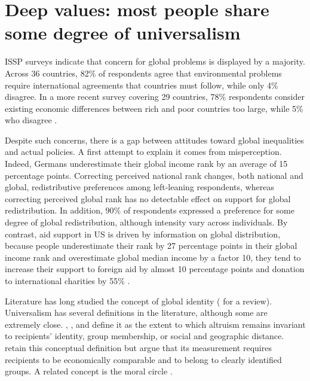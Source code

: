 \section{Deep values: most people share some degree of universalism}





ISSP surveys indicate that concern for global problems is displayed by a majority. Across 36 countries, 82\% of respondents agree that environmental problems require international agreements that countries must follow, while only 4\% disagree. In a more recent survey covering 29 countries, 78\% respondents consider existing economic differences between rich and poor countries too large, while 5\% who disagree \citep{issp_environment_2010,issp_inequality_2019}. 

Despite such concerns, there is a gap between attitudes toward global inequalities and actual policies. A first attempt to explain it comes from misperception. Indeed, Germans underestimate their global income rank by an average of 15 percentage points. Correcting perceived national rank changes, both national and global, redistributive preferences among left-leaning respondents, whereas correcting perceived global rank has no detectable effect on support for global redistribution. In addition, 90\% of respondents expressed a preference for some degree of global redistribution, although intensity vary across individuals.
By contrast, aid support in US is driven by information on global distribution, because people underestimate their rank by 27 percentage points in their global income rank and overestimate global median income by a factor 10, they tend to increase their support to foreign aid by almost 10 percentage points and donation to international charities by 55\% \citep{nair_misperceptions_2018}.


Literature has long studied the concept of global identity (\citet{rey_2018} for a review). Universalism has several definitions in the literature, although some are extremely close. \citet{enke_moral_2023}, \citet{enke_universalism_2024}, and \citet{cappelen_universalism_2025} define it as the extent to which altruism remains invariant to recipients' identity, group membership, or social and geographic distance. \citet{boyer-kassem_how_2026} retain this conceptual definition but argue that its measurement requires recipients to be economically comparable and to belong to clearly identified groups. A related concept is the moral circle \citep{waytz_ideological_2019,jaeger_toward_2026}.

